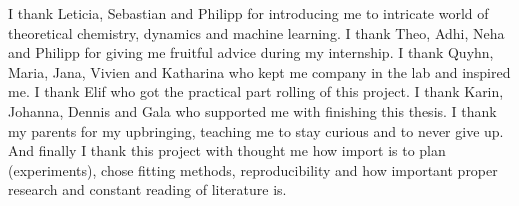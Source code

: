 I thank Leticia, Sebastian and Philipp for introducing me to intricate world of theoretical chemistry, dynamics and machine learning. 
I thank Theo, Adhi, Neha and Philipp for giving me fruitful advice during my internship.
I thank Quyhn, Maria, Jana, Vivien and Katharina who kept me company in the lab and inspired me. 
I thank Elif who got the practical part rolling of this project. 
I thank Karin, Johanna, Dennis and Gala who supported me with finishing this thesis. 
I thank my parents for my upbringing, teaching me to stay curious and to never give up.
And finally I thank this project with thought me how import is to plan (experiments), chose fitting methods, reproducibility and how important proper research and constant reading of literature is. 
